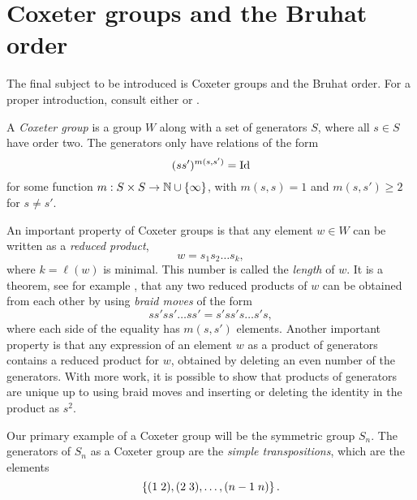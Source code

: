 \section{Coxeter groups and the Bruhat order}
\label{sec:bruhat}

The final subject to be introduced is Coxeter groups and the Bruhat
order. For a proper introduction, consult either \cite{bjorner} or
\cite{hiller}.

\begin{definition}
  A \textit{Coxeter group} is a group $W$ along with a set of
  generators $S$,
  where all $s \in S$ have order two. The generators only have
  relations of the form
  \[ (s s')^{m(s,s')} = \operatorname{Id} \]
  for some function $m : S \times S \to \mathbb{N}\cup\left\{ \infty \right\}$, with
  $m(s,s) = 1$ and $m(s,s') \geq 2$ for $s\neq s'$.
\end{definition}

An important property of Coxeter groups is that any element $w \in W$
can be written as a \textit{reduced product},
\[ w = s_1 s_2 \dots s_k, \]
where $k = \ell(w)$ is minimal. This number is called the
\textit{length} of $w$. It is a theorem, see for example \cite[Chapter
1.5]{bjorner}, that any two reduced products of $w$ can be obtained
from each other by using \textit{braid moves} of the form
\[ s s' s s' \dots s s' = s' s s' s \dots s' s, \]
where each side of the equality has $m(s,s')$ elements. Another
important property is that any expression of an element $w$ as a
product of generators contains a reduced product for $w$, obtained by
deleting an even number of the generators. With more
work, it is possible to show that products of generators are unique up
to using braid moves and inserting or deleting the identity in the
product as $s^2$.

Our primary example of a Coxeter group will be the
symmetric group $S_n$.
The generators of $S_n$ as a Coxeter group are the \textit{simple
  transpositions}, which are the elements
\[ \left\{ (1\; 2), (2\; 3), \dots, (n-1 \; n)  \right\}. \]

